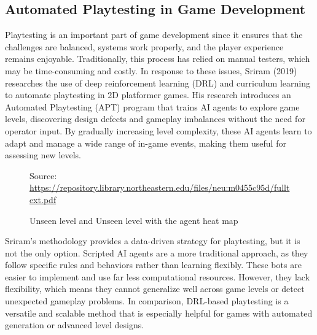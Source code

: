\documentclass[12pt,oneside,openright,a4paper]{cpe-english-project}
\begin{document}
\subsection{Automated Playtesting in Game Development}
Playtesting is an important part of game development since it ensures that the challenges are balanced, systems work properly, and the player experience remains enjoyable. Traditionally, this process has relied on manual testers, which may be time-consuming and costly. In response to these issues, Sriram (2019)\cite {playtesting} researches the use of deep reinforcement learning (DRL) and curriculum learning to automate playtesting in 2D platformer games. His research introduces an Automated Playtesting (APT) program that trains AI agents to explore game levels, discovering design defects and gameplay imbalances without the need for operator input. By gradually increasing level complexity, these AI agents learn to adapt and manage a wide range of in-game events, making them useful for assessing new levels.\par
\begin{figure}[!h]
\centering
{}
\caption{Unseen level and Unseen level with the agent heat map}\label{fig:UnseenLevel}
Source:
\href{https://repository.library.northeastern.edu/files/neu:m0455c95d/fulltext.pdf}{https://repository.library.northeastern.edu/files/neu:m0455c95d/fulltext.pdf} 
\end{figure}
Sriram's methodology provides a data-driven strategy for playtesting, but it is not the only option. Scripted AI agents are a more traditional approach, as they follow specific rules and behaviors rather than learning flexibly. These bots are easier to implement and use far less computational resources. However, they lack flexibility, which means they cannot generalize well across game levels or detect unexpected gameplay problems. In comparison, DRL-based playtesting is a versatile and scalable method that is especially helpful for games with automated generation or advanced level designs.\par
\newpage
\end{document}
